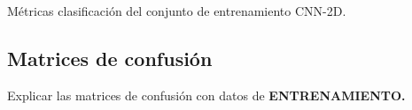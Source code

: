 \begin{table}
        \begin{subtable}{.2\textwidth}
          \centering
          \renewcommand{\arraystretch}{1.2}

          \caption{Métricas clasificación del conjunto de entrenamiento CNN-2D.}
          \label{CNN2DTrainMetrics}
        \end{subtable}
    \end{table}

  \subsection{Matrices de confusión}

    Explicar las matrices de confusión con datos de \textbf{ENTRENAMIENTO.}

